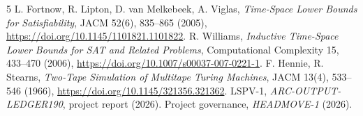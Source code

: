 \documentclass[11pt]{article}
\begin{document}
\begin{thebibliography}{5}
 L. Fortnow, R. Lipton, D. van Melkebeek, A. Viglas,
\emph{Time-Space Lower Bounds for Satisfiability}, JACM 52(6), 835--865
(2005), \url{https://doi.org/10.1145/1101821.1101822}.
 R. Williams, \emph{Inductive Time-Space Lower Bounds for
SAT and Related Problems}, Computational Complexity 15, 433--470 (2006),
\url{https://doi.org/10.1007/s00037-007-0221-1}.
 F. Hennie, R. Stearns, \emph{Two-Tape Simulation of Multitape
Turing Machines}, JACM 13(4), 533--546 (1966),
\url{https://doi.org/10.1145/321356.321362}.
 LSPV-1, \emph{ARC-OUTPUT-LEDGER190}, project report (2026).
 Project governance, \emph{HEADMOVE-1} (2026).
\end{thebibliography}
\end{document}
